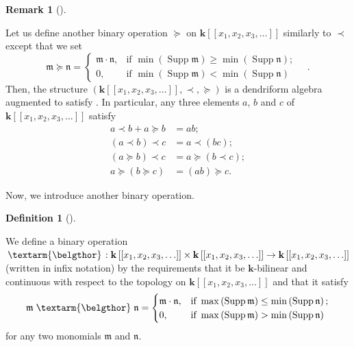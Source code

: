 \documentclass[numbers=enddot,12pt,final,onecolumn,notitlepage,abstracton]{scrartcl}%
\theoremstyle{definition}
\newtheorem{defi}[theo]{Definition}
\newenvironment{definition}[1][]
{\begin{defi}[#1]\begin{leftbar}}
{\end{leftbar}\end{defi}}
\newtheorem{remk}[theo]{Remark}
\newenvironment{remark}[1][]
{\begin{remk}[#1]\begin{leftbar}}
{\end{leftbar}\end{remk}}
\newcommand{\bel}{\left. \textarm{\belgthor} \right.}
\begin{document}
\begin{remark}
\label{rmk.dendri}Let us define another binary operation $\left.
\succeq\right.  $ on $\mathbf{k}\left[  \left[  x_{1},x_{2},x_{3}%
,\ldots\right]  \right]  $ similarly to $\left.  \prec\right.  $ except that
we set%
\[
\mathfrak{m}\left.  \succeq\right.  \mathfrak{n}=
\begin{cases}
\mathfrak{m}\cdot\mathfrak{n}, & \text{if }\min\left(  \operatorname*{Supp}%
\mathfrak{m}\right)  \geq\min\left(  \operatorname*{Supp}\mathfrak{n}\right)
;\\
0, & \text{if }\min\left(  \operatorname*{Supp}\mathfrak{m}\right)
<\min\left(  \operatorname*{Supp}\mathfrak{n}\right)
\end{cases}
\quad.
\]
Then, the structure $\left(  \mathbf{k}\left[  \left[  x_{1},x_{2}%
,x_{3},\ldots\right]  \right]  ,\left.  \prec\right.  , \left.  \succeq
\right.  \right)  $ is a dendriform algebra augmented to satisfy
\cite[(15)]{EbrFar08}. In particular, any three elements $a$, $b$ and $c$ of
$\mathbf{k}\left[  \left[  x_{1},x_{2},x_{3},\ldots\right]  \right]  $ satisfy%
\begin{align*}
a\left.  \prec\right.  b+a \left.  \succeq\right.  b  &  =ab;\\
\left(  a\left.  \prec\right.  b\right)  \left.  \prec\right.  c  &  =a\left.
\prec\right.  \left(  bc\right)  ;\\
\left(  a\left.  \succeq\right.  b\right)  \left.  \prec\right.  c  &
=a\left.  \succeq\right.  \left(  b\left.  \prec\right.  c\right)  ;\\
a\left.  \succeq\right.  \left(  b\left.  \succeq\right.  c\right)   &
=\left(  ab\right)  \left.  \succeq\right.  c.
\end{align*}

\end{remark}

Now, we introduce another binary operation.

\begin{definition}
\label{def.belgthor}We define a binary operation $\bel :\mathbf{k}\left[
\left[  x_{1},x_{2},x_{3},\ldots\right]  \right]  \times\mathbf{k}\left[
\left[  x_{1},x_{2},x_{3},\ldots\right]  \right]  \rightarrow\mathbf{k}\left[
\left[  x_{1},x_{2},x_{3},\ldots\right]  \right]  $ (written in infix
notation) by the requirements that it be $\mathbf{k}$-bilinear and continuous
with respect to the topology on $\mathbf{k}\left[  \left[  x_{1},x_{2}%
,x_{3},\ldots\right]  \right]  $ and that it satisfy%
\[
\mathfrak{m} \bel \mathfrak{n}=
\begin{cases}
\mathfrak{m}\cdot\mathfrak{n}, & \text{if }\max\left(  \operatorname*{Supp}%
\mathfrak{m}\right)  \leq\min\left(  \operatorname*{Supp}\mathfrak{n}\right)
;\\
0, & \text{if }\max\left(  \operatorname*{Supp}\mathfrak{m}\right)
>\min\left(  \operatorname*{Supp}\mathfrak{n}\right)
\end{cases}
\]
for any two monomials $\mathfrak{m}$ and $\mathfrak{n}$.
\end{definition}
\end{document}
